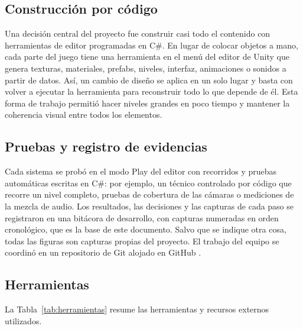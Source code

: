 \documentclass[stu,letterpaper,12pt,donotrepeattitle,floatsintext]{apa7}
\begin{document}
\subsection{Construcción por código}

Una decisión central del proyecto fue construir casi todo el contenido con herramientas de editor
programadas en C\#. En lugar de colocar objetos a mano, cada parte del juego tiene una herramienta
en el menú  del editor de Unity que genera texturas, materiales, prefabs, niveles,
interfaz, animaciones o sonidos a partir de datos. Así, un cambio de diseño se aplica en un solo
lugar y basta con volver a ejecutar la herramienta para reconstruir todo lo que depende de él. Esta
forma de trabajo permitió hacer niveles grandes en poco tiempo y mantener la coherencia visual entre
todos los elementos.

\subsection{Pruebas y registro de evidencias}

Cada sistema se probó en el modo Play del editor con recorridos y pruebas automáticas escritas en
C\#: por ejemplo, un técnico controlado por código que recorre un nivel completo, pruebas de
cobertura de las cámaras o mediciones de la mezcla de audio. Los resultados, las decisiones y las
capturas de cada paso se registraron en una bitácora de desarrollo, con capturas numeradas en orden
cronológico, que es la base de este documento. Salvo que se indique otra cosa, todas las figuras son
capturas propias del proyecto. El trabajo del equipo se coordinó en un repositorio de Git alojado en
GitHub \parencite{repositorio2026}.

\subsection{Herramientas}

La Tabla~\ref{tab:herramientas} resume las herramientas y recursos externos utilizados.
\end{document}
